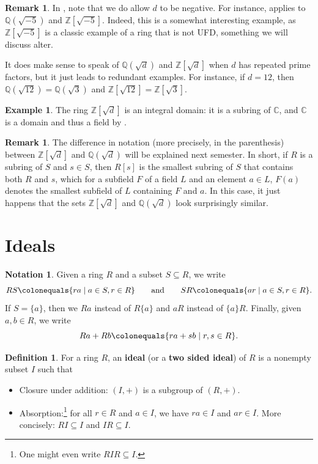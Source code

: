 \documentclass[12pt]{report}
\numberwithin{equation}{section}
\numberwithin{theorem}{chapter}
\theoremstyle{definition}
\newtheorem{definition}[theorem]{Definition}
\newtheorem{example}[theorem]{Example}
\newtheorem*{basic properties}{Basic Properties}
\newtheorem*{Important Remark}{Important Remark}
\newtheorem{remark}[theorem]{Remark}
\newtheorem{notation}[theorem]{Notation}
\newcommand{\df}[1]{{\bf #1}\index{#1}}
\newcommand{\Z}{\mathbb{Z}}
\newcommand{\Q}{\mathbb{Q}}
\newcommand{\C}{\mathbb{C}}
\begin{document}
\begin{remark}
In , note that we do allow $d$ to be negative. For instance,  applies to $\Q(\sqrt{-5})$ and $\Z[\sqrt{-5}]$. Indeed, this is a somewhat interesting example, as $\Z[\sqrt{-5}]$ is a classic example of a ring that is not UFD, something we will discuss alter.

It does make sense to speak of $\Q(\sqrt{d})$ and $\Z[\sqrt{d}]$ when $d$ has repeated prime factors, but it just leads to redundant examples. For instance, if $d = 12$, then $\Q(\sqrt{12}) = \Q(\sqrt{3})$ and $\Z[\sqrt{12}] = \Z[\sqrt{3}]$.	
\end{remark}

\begin{example} 
 The ring $\Z[\sqrt{d}]$ is an integral domain: it is a subring of $\C$, and $\C$ is a domain and thus a field by .
\end{example}
  

\begin{remark}
	The difference in notation (more precisely, in the parenthesis) between $\Z[\sqrt{d}]$ and $\Q(\sqrt{d})$ will be explained next semester. In short, if $R$ is a subring of $S$ and $s \in S$, then $R[s]$ is the smallest subring of $S$ that contains both $R$ and $s$, which for a subfield $F$ of a field $L$ and an element $a \in L$, $F(a)$ denotes the smallest subfield of $L$ containing $F$ and $a$. In this case, it just happens that the sets $\Z[\sqrt{d}]$ and $\Q(\sqrt{d})$ look surprisingly similar. 
\end{remark}

\section{Ideals}

\begin{notation}
Given a ring $R$ and a subset $S \subseteq R$, we write
	$$RS \colonequals \{ ra \mid a \in S, r \in R \} \qquad \text{and} \qquad SR \colonequals \{ ar \mid a \in S, r \in R \}.$$
If $S = \{ a \}$, then we $Ra$ instead of $R \{ a \}$ and $aR$ instead of $\{ a \}R$. Finally, given $a, b \in R$, we write
$$Ra + R b \colonequals \{ ra + sb \mid r, s \in R \}.$$
\end{notation}


\begin{definition}
For a ring $R$, an \df{ideal} (or a \df{two sided ideal}) of $R$ is a nonempty subset $I$ such that
\begin{itemize}[itemsep=0.1em]
\item Closure under addition: $(I,+)$ is a subgroup of $(R,+)$.
\item Absorption:\footnote{One might even write $RIR \subseteq I$.}
for all $r \in R$ and $a \in I$, we have $ra \in I$ and $ar \in I$. More concisely: $RI\subseteq I$ and $IR\subseteq I$.
\end{itemize}
\end{definition}
\end{document}

